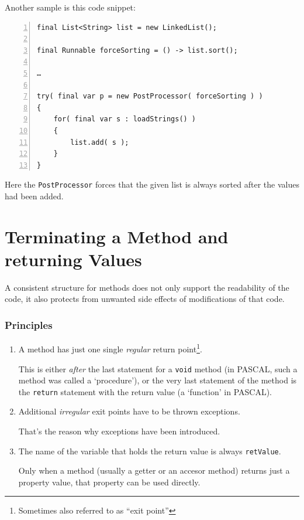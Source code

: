 Another sample is this code snippet:
\begin{lstlisting}[numbers=left]
final List<String> list = new LinkedList();

final Runnable forceSorting = () -> list.sort();

…

try( final var p = new PostProcessor( forceSorting ) )
{
    for( final var s : loadStrings() )
    {
        list.add( s );
    }
}
\end{lstlisting}

Here the \lstinline|PostProcessor| forces that the given list is always sorted after the values had been added.


\section{Terminating a Method and returning Values}\label{sec:ReturningValues}
A consistent structure for methods does not only support the readability of the code, it also protects from unwanted side effects of modifications of that code.


\subsubsection{Principles}
\begin{enumerate}[label=P\arabic*.]
\item{A method has just one single \textit{regular} return point\footnote{Sometimes also referred to as “exit point”}.

This is either \textit{after} the last statement for a \lstinline|void| method (in PASCAL, such a method was called a ‘procedure’), or the very last statement of the method is the \lstinline|return| statement with the return value (a ‘function’ in PASCAL).}

\item{Additional \textit{irregular} exit points have to be thrown exceptions.

That's the reason why exceptions have been introduced.}

\item{The name of the variable that holds the return value is always \lstinline|retValue|.

Only when a method (usually a getter or an accesor method) returns just a property value, that property can be used directly.}
\end{enumerate}

